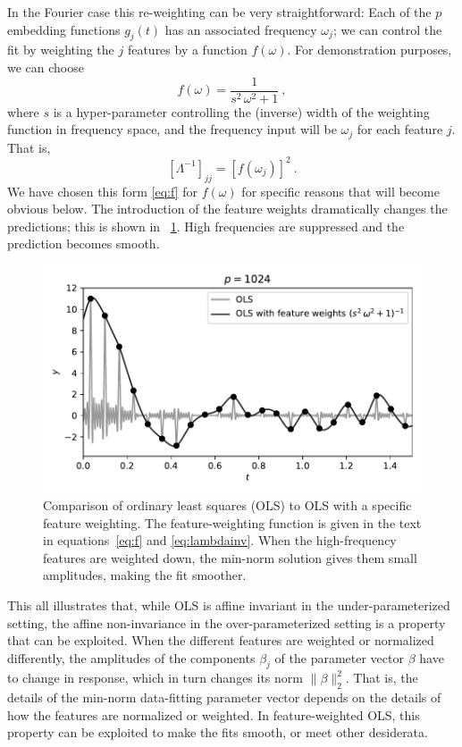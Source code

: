 \documentclass[12pt,letterpaper]{article}
\newlength{\figurewidth}
\begin{document}
In the Fourier case this re-weighting can be very straightforward: Each of the $p$ embedding functions $g_j(t)$ has an associated frequency $\omega_j$; we can control the fit by weighting the $j$ features by a function $f(\omega)$.
For demonstration purposes, we can choose
\begin{equation}\label{eq:f}
    f(\omega) = \frac{1}{s^2\,\omega^2 + 1}
    ~,
\end{equation}
where $s$ is a hyper-parameter controlling the (inverse) width of the weighting function in frequency space, and the frequency input will be $\omega_j$ for each feature $j$. That is,
\begin{equation}\label{eq:lambdainv}
    [\Lambda^{-1}]_{jj} = [f(\omega_j)]^2
    ~.
\end{equation}
We have chosen this form \eqref{eq:f} for $f(\omega)$ for specific reasons that will become obvious below.
The introduction of the feature weights dramatically changes the predictions; this is shown in \figurename~\ref{fig:fwols}.
High frequencies are suppressed and the prediction becomes smooth.
\begin{figure}[t]
    \begin{mdframed}
    \includegraphics[width=\figurewidth]{paper/weighted-OLS.pdf}
    \caption{Comparison of ordinary least squares (OLS) to OLS with a specific feature weighting. The feature-weighting function is given in the text in equations~\eqref{eq:f} and \eqref{eq:lambdainv}. When the high-frequency features are weighted down, the min-norm solution gives them small amplitudes, making the fit smoother.}
    \label{fig:fwols}
    \end{mdframed}
\end{figure}

This all illustrates that, while OLS is affine invariant in the under-parameterized setting, the affine non-invariance in the over-parameterized setting is a property that can be exploited.
When the different features are weighted or normalized differently, the amplitudes of the components $\beta_j$ of the parameter vector $\beta$ have to change in response, which in turn changes its norm $\|\beta\|_2^2$.
That is, the details of the min-norm data-fitting parameter vector depends on the details of how the features are normalized or weighted.
In feature-weighted OLS, this property can be exploited to make the fits smooth, or meet other desiderata.
\end{document}
